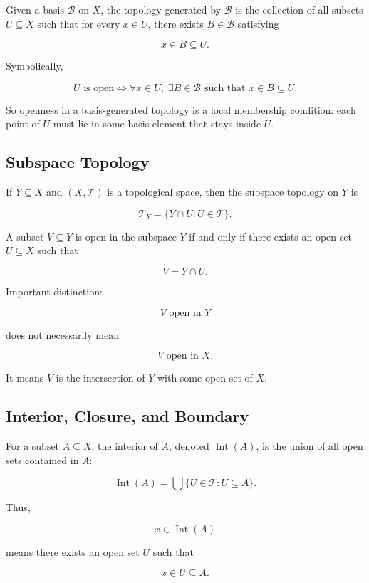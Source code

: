\documentclass{article}
\begin{document}
	Given a basis \(\mathcal{B}\) on \(X\), the topology generated by \(\mathcal{B}\) is the collection of all subsets \(U\subseteq X\) such that for every \(x\in U\), there exists \(B\in\mathcal{B}\) satisfying
	
	$$
	x\in B\subseteq U.
	$$
	
	Symbolically,
	
	$$
	U\text{ is open}
	\iff
	\forall x\in U,\; \exists B\in\mathcal{B}\text{ such that }x\in B\subseteq U.
	$$
	
	So openness in a basis-generated topology is a local membership condition: each point of \(U\) must lie in some basis element that stays inside \(U\).
	
	\subsection{Subspace Topology}
	
	If \(Y\subseteq X\) and \((X,\mathcal{T})\) is a topological space, then the subspace topology on \(Y\) is
	
	$$
	\mathcal{T}_Y=\{Y\cap U:U\in\mathcal{T}\}.
	$$
	
	A subset \(V\subseteq Y\) is open in the subspace \(Y\) if and only if there exists an open set \(U\subseteq X\) such that
	
	$$
	V=Y\cap U.
	$$
	
	Important distinction:
	
	$$
	V\text{ open in }Y
	$$
	
	does not necessarily mean
	
	$$
	V\text{ open in }X.
	$$
	
	It means \(V\) is the intersection of \(Y\) with some open set of \(X\).
	
	\subsection{Interior, Closure, and Boundary}
	
	For a subset \(A\subseteq X\), the interior of \(A\), denoted \(\operatorname{Int}(A)\), is the union of all open sets contained in \(A\):
	
	$$
	\operatorname{Int}(A)
	=
	\bigcup\{U\in\mathcal{T}:U\subseteq A\}.
	$$
	
	Thus,
	
	$$
	x\in\operatorname{Int}(A)
	$$
	
	means there exists an open set \(U\) such that
	
	$$
	x\in U\subseteq A.
	$$
	
\end{document}
